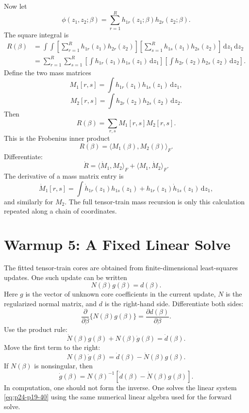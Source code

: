 \documentclass[11pt]{article}
\newcommand{\dd}{\,\mathrm d}
\begin{document}
Now let
\[
    \phi(z_1,z_2;\beta)
    =
    \sum_{r=1}^{R}h_{1r}(z_1;\beta)h_{2r}(z_2;\beta).
    \label{eq:p24-p19-29}
\]
The square integral is
\[
\begin{aligned}
    R(\beta)
    &=
    \int\!\!\int
    \left[
    \sum_{r=1}^{R}h_{1r}(z_1)h_{2r}(z_2)
    \right]
    \left[
    \sum_{s=1}^{R}h_{1s}(z_1)h_{2s}(z_2)
    \right]
    \dd z_1\dd z_2\\
    &=
    \sum_{r=1}^{R}\sum_{s=1}^{R}
    \left[\int h_{1r}(z_1)h_{1s}(z_1)\dd z_1\right]
    \left[\int h_{2r}(z_2)h_{2s}(z_2)\dd z_2\right].
\end{aligned}
\label{eq:p24-p19-30}
\]
Define the two mass matrices
\[
    M_1[r,s]=\int h_{1r}(z_1)h_{1s}(z_1)\dd z_1,
    \label{eq:p24-p19-31}
\]
\[
    M_2[r,s]=\int h_{2r}(z_2)h_{2s}(z_2)\dd z_2.
    \label{eq:p24-p19-32}
\]
Then
\[
    R(\beta)=\sum_{r,s}M_1[r,s]M_2[r,s].
    \label{eq:p24-p19-33}
\]
This is the Frobenius inner product
\[
    R(\beta)=\langle M_1(\beta),M_2(\beta)\rangle_F.
    \label{eq:p24-p19-34}
\]
Differentiate:
\[
    \dot R
    =
    \langle \dot M_1,M_2\rangle_F
    +
    \langle M_1,\dot M_2\rangle_F.
    \label{eq:p24-p19-35}
\]
The derivative of a mass matrix entry is
\[
    \dot M_1[r,s]
    =
    \int
    \dot h_{1r}(z_1)h_{1s}(z_1)
    +
    h_{1r}(z_1)\dot h_{1s}(z_1)
    \dd z_1,
    \label{eq:p24-p19-36}
\]
and similarly for \(M_2\).  The full tensor-train mass recursion is only this
calculation repeated along a chain of coordinates.

\section{Warmup 5: A Fixed Linear Solve}

The fitted tensor-train cores are obtained from finite-dimensional least-squares
updates.  One such update can be written
\[
    N(\beta)g(\beta)=d(\beta).
    \label{eq:p24-p19-37}
\]
Here \(g\) is the vector of unknown core coefficients in the current update,
\(N\) is the regularized normal matrix, and \(d\) is the right-hand side.
Differentiate both sides:
\[
    \frac{\partial}{\partial\beta}\{N(\beta)g(\beta)\}
    =
    \frac{\partial d(\beta)}{\partial\beta}.
    \label{eq:p24-p19-38}
\]
Use the product rule:
\[
    \dot N(\beta)g(\beta)+N(\beta)\dot g(\beta)=\dot d(\beta).
    \label{eq:p24-p19-39}
\]
Move the first term to the right:
\[
    N(\beta)\dot g(\beta)=\dot d(\beta)-\dot N(\beta)g(\beta).
    \label{eq:p24-p19-40}
\]
If \(N(\beta)\) is nonsingular, then
\[
    \dot g(\beta)=
    N(\beta)^{-1}\left[\dot d(\beta)-\dot N(\beta)g(\beta)\right].
    \label{eq:p24-p19-41}
\]
In computation, one should not form the inverse.  One solves the linear system
\eqref{eq:p24-p19-40} using the same numerical linear algebra used for the forward solve.
\end{document}
